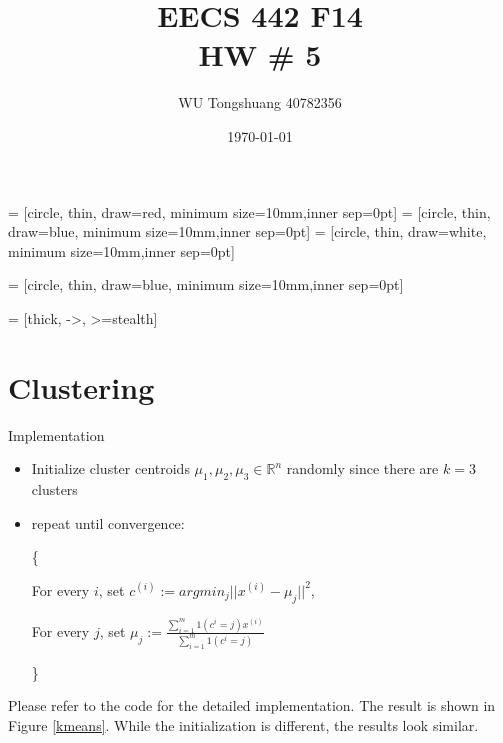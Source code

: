 \documentclass[12pt,a4paper]{article}
\title{EECS 442 F14\\HW \# 5}
\author{WU Tongshuang 40782356}
\date{\today}
\begin{document}

 = [circle, thin, draw=red, minimum size=10mm,inner sep=0pt]
 = [circle, thin, draw=blue, minimum size=10mm,inner sep=0pt]
 = [circle, thin, draw=white, minimum size=10mm,inner sep=0pt]

 = [circle, thin, draw=blue, minimum size=10mm,inner sep=0pt]

 = [thick, ->, >=stealth]

\maketitle

\section{Clustering}

Implementation
\begin{itemize}
    \item Initialize cluster centroids $\mu_1, \mu_2, \mu_3 \in \mathbb{R}^n$ randomly since there are $k = 3$ clusters
    \item repeat until convergence:
    
    \{
    
    For every $i$, set $c^{(i)} := arg min_j ||x^{(i)}-\mu_j||^2$,
    
    For every $j$, set $\mu_j := \frac{\sum_{i=1}^{m} 1(c^{i}=j)x^{(i)}}{\sum_{i=1}^{m} 1(c^{i}=j)}$
    
    \} 
\end{itemize}

Please refer to the code for the detailed implementation. The result is shown in Figure \ref{kmeans}. While the initialization is different, the results look similar.
\end{document}
